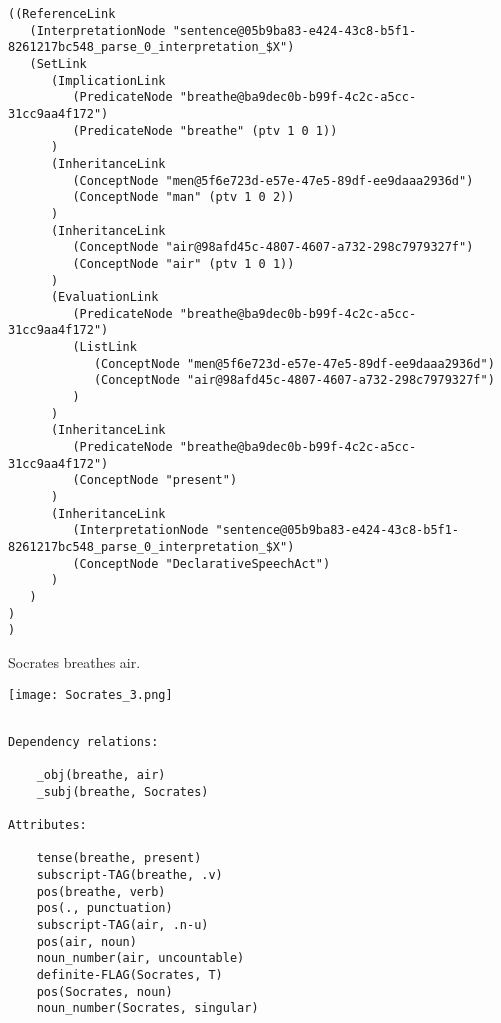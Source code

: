 \begin{verbatim}
((ReferenceLink
   (InterpretationNode "sentence@05b9ba83-e424-43c8-b5f1-8261217bc548_parse_0_interpretation_$X")
   (SetLink
      (ImplicationLink
         (PredicateNode "breathe@ba9dec0b-b99f-4c2c-a5cc-31cc9aa4f172")
         (PredicateNode "breathe" (ptv 1 0 1))
      )
      (InheritanceLink
         (ConceptNode "men@5f6e723d-e57e-47e5-89df-ee9daaa2936d")
         (ConceptNode "man" (ptv 1 0 2))
      )
      (InheritanceLink
         (ConceptNode "air@98afd45c-4807-4607-a732-298c7979327f")
         (ConceptNode "air" (ptv 1 0 1))
      )
      (EvaluationLink
         (PredicateNode "breathe@ba9dec0b-b99f-4c2c-a5cc-31cc9aa4f172")
         (ListLink
            (ConceptNode "men@5f6e723d-e57e-47e5-89df-ee9daaa2936d")
            (ConceptNode "air@98afd45c-4807-4607-a732-298c7979327f")
         )
      )
      (InheritanceLink
         (PredicateNode "breathe@ba9dec0b-b99f-4c2c-a5cc-31cc9aa4f172")
         (ConceptNode "present")
      )
      (InheritanceLink
         (InterpretationNode "sentence@05b9ba83-e424-43c8-b5f1-8261217bc548_parse_0_interpretation_$X")
         (ConceptNode "DeclarativeSpeechAct")
      )
   )
)
)
\end{verbatim}


  Socrates breathes air.

\texttt{[image: Socrates\_3.png]}

\begin{verbatim}

Dependency relations:

    _obj(breathe, air)
    _subj(breathe, Socrates)

Attributes:

    tense(breathe, present)
    subscript-TAG(breathe, .v)
    pos(breathe, verb)
    pos(., punctuation)
    subscript-TAG(air, .n-u)
    pos(air, noun)
    noun_number(air, uncountable)
    definite-FLAG(Socrates, T)
    pos(Socrates, noun)
    noun_number(Socrates, singular)

\end{verbatim}


